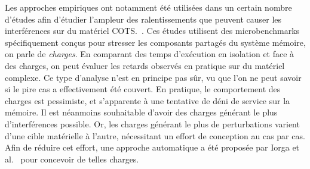 Les approches empiriques ont notamment été utilisées dans un certain nombre d'études afin d'étudier l'ampleur des ralentissements que peuvent causer les interférences sur du matériel COTS.~\cite{zhuravlev2010addressing,bin2014studying,radojkovic2012evaluation,fernandez2012assessing,6214768}.
Ces études utilisent des microbenchmarks spécifiquement conçus pour stresser les composants partagés du système mémoire, on parle de \emph{charges}.
En comparant des temps d'exécution en isolation et face à des charges, on peut évaluer les retards observés en pratique sur du matériel complexe.
Ce type d'analyse n'est en principe pas sûr, vu que l'on ne peut savoir si le pire cas a effectivement été couvert.
En pratique, le comportement des charges est pessimiste, et s'apparente à une tentative de déni de service sur la mémoire.
Il est néanmoins souhaitable d'avoir des charges générant le plus d'interférences possible.
Or, les charges générant le plus de perturbations varient d'une cible matérielle à l'autre, nécessitant un effort de conception au cas par cas.
Afin de réduire cet effort, une approche automatique a été proposée par Iorga et al.~\cite{iorga2018your} pour concevoir de telles charges.



